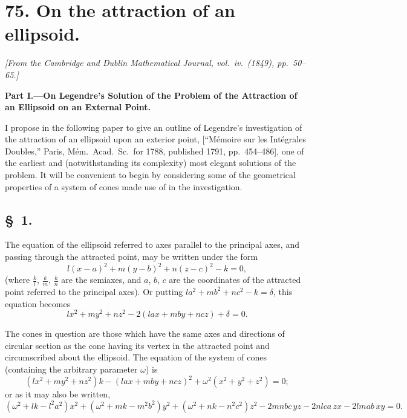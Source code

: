 \documentclass[11pt,a4paper]{article}
\theoremstyle{definition}
\begin{document}
\newpage
\section*{75. On the attraction of an ellipsoid.}

\begin{flushright}
\textit{[From the Cambridge and Dublin Mathematical Journal, vol.\ iv.\ (1849), pp.\ 50--65.]}
\end{flushright}

\setcounter{page}{432}

\begin{center}
\textbf{Part I.---On Legendre's Solution of the Problem of the Attraction of an Ellipsoid on an External Point.}
\end{center}

\textsc{I} propose in the following paper to give an outline of Legendre's investigation of the attraction of an ellipsoid upon an exterior point, [``M\'{e}moire sur les Int\'{e}grales Doubles,'' Paris, M\'{e}m.\ Acad.\ Sc.\ for 1788, published 1791, pp.~454--486], one of the earliest and (notwithstanding its complexity) most elegant solutions of the problem. It will be convenient to begin by considering some of the geometrical properties of a system of cones made use of in the investigation.

\subsection*{\S~1.}

The equation of the ellipsoid referred to axes parallel to the principal axes, and passing through the attracted point, may be written under the form
\[
l(x-a)^{2} + m(y-b)^{2} + n(z-c)^{2} - k = 0,
\]
(where $\frac{k}{l}$, $\frac{k}{m}$, $\frac{k}{n}$ are the semiaxes, and $a$, $b$, $c$ are the coordinates of the attracted point referred to the principal axes). Or putting $la^{2} + mb^{2} + nc^{2} - k = \delta$, this equation becomes
\[
lx^{2} + my^{2} + nz^{2} - 2(lax + mby + ncz) + \delta = 0.
\]

The cones in question are those which have the same axes and directions of circular section as the cone having its vertex in the attracted point and circumscribed about the ellipsoid. The equation of the system of cones (containing the arbitrary parameter $\omega$) is
\[
(lx^{2} + my^{2} + nz^{2})k - (lax + mby + ncz)^{2} + \omega^{2}(x^{2} + y^{2} + z^{2}) = 0;
\]
or as it may also be written,
\[
(\omega^{2} + lk - l^{2}a^{2})x^{2} + (\omega^{2} + mk - m^{2}b^{2})y^{2} + (\omega^{2} + nk - n^{2}c^{2})z^{2} - 2mnbc\,yz - 2nlca\,zx - 2lmab\,xy = 0.
\]
\end{document}
